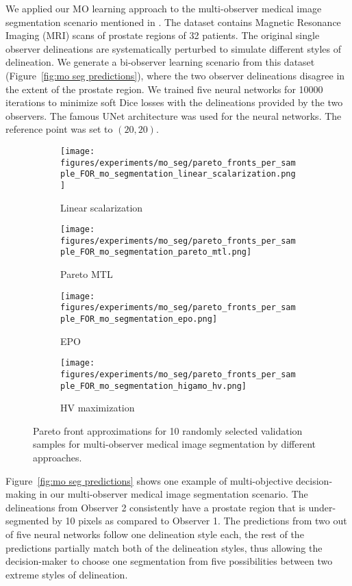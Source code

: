 We applied our MO learning approach to the multi-observer medical image segmentation scenario mentioned in \cite{ArkadiySPIE2020}. The dataset \citep{simpson2019large} contains Magnetic Resonance Imaging (MRI) scans of prostate regions of 32 patients. The original single observer delineations are systematically perturbed to simulate different styles of delineation. We generate a bi-observer learning scenario from this dataset (Figure~\ref{fig:mo seg predictions}), where the two observer delineations disagree in the extent of the prostate region. %
We trained five neural networks for 10000 iterations to minimize soft Dice losses with the delineations provided by the two observers. The famous UNet \citep{UnetMiccai} architecture was used for the neural networks. The reference point was set to $(20, 20)$.
\begin{figure*}[h!]
\begin{subfigure}{0.4\textwidth}
    \centering
    \texttt{[image: figures/experiments/mo\_seg/pareto\_fronts\_per\_sample\_FOR\_mo\_segmentation\_linear\_scalarization.png]}
    \caption{Linear scalarization}
    \label{fig:mo_seg_lin_scal}
\end{subfigure}
\begin{subfigure}{0.4\textwidth}
    \centering
    \texttt{[image: figures/experiments/mo\_seg/pareto\_fronts\_per\_sample\_FOR\_mo\_segmentation\_pareto\_mtl.png]}
    \caption{Pareto MTL}
    \label{fig:mo_seg_pareto_mtl}
\end{subfigure}
\begin{subfigure}{0.4\textwidth}
    \centering
    \texttt{[image: figures/experiments/mo\_seg/pareto\_fronts\_per\_sample\_FOR\_mo\_segmentation\_epo.png]}
    \caption{EPO}
    \label{fig:mo_seg_epo}
\end{subfigure}
\begin{subfigure}{0.4\textwidth}
    \centering
    \texttt{[image: figures/experiments/mo\_seg/pareto\_fronts\_per\_sample\_FOR\_mo\_segmentation\_higamo\_hv.png]}
    \caption{HV maximization}
    \label{fig:mo_seg_higamo_hv}
\end{subfigure}
    \centering
    \caption{Pareto front approximations for 10 randomly selected validation samples for multi-observer medical image segmentation by different approaches.}
    \label{fig:mo seg results}
\end{figure*}

Figure~\ref{fig:mo seg predictions} shows one example of multi-objective decision-making in our multi-observer medical image segmentation scenario. The delineations from Observer 2 consistently have a prostate region that is under-segmented by 10 pixels as compared to Observer 1. The predictions from two out of five neural networks follow one delineation style each, the rest of the predictions partially match both of the delineation styles, thus allowing the decision-maker to choose one segmentation from five possibilities between two extreme styles of delineation.

